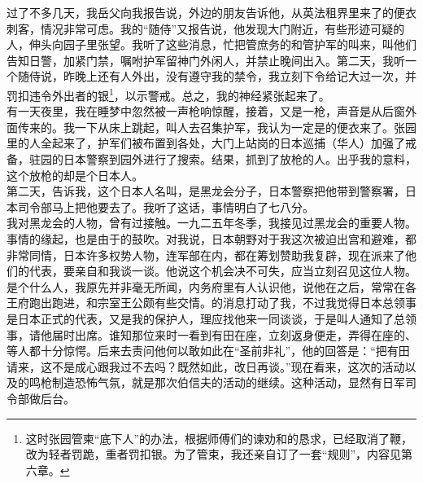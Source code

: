 过了不多几天，我岳父向我报告说，外边的朋友告诉他，从英法租界里来了的便衣刺客，情况非常可虑。我的“随侍”又报告说，他发现大门附近，有些形迹可疑的人，伸头向园子里张望。我听了这些消息，忙把管庶务的和管护军的叫来，叫他们告知日警，加紧门禁，嘱咐护军留神门外闲人，并禁止晚间出入。第二天，我听一个随侍说，昨晚上还有人外出，没有遵守我的禁令，我立刻下令给记大过一次，并罚扣违令外出者的银\footnote{这时张园管柬“底下人”的办法，根据师傅们的谏劝和的恳求，已经取消了鞭，改为轻者罚跪，重者罚扣银。为了管束，我还亲自订了一套“规则”，内容见第六章。}，以示警戒。总之，我的神经紧张起来了。\\

有一天夜里，我在睡梦中忽然被一声枪响惊醒，接着，又是一枪，声音是从后窗外面传来的。我一下从床上跳起，叫人去召集护军，我认为一定是的便衣来了。张园里的人全起来了，护军们被布置到各处，大门上站岗的日本巡捕（华人）加强了戒备，驻园的日本警察到园外进行了搜索。结果，抓到了放枪的人。出乎我的意料，这个放枪的却是个日本人。\\

第二天，告诉我，这个日本人名叫，是黑龙会分子，日本警察把他带到警察署，日本司令部马上把他要去了。我听了这话，事情明白了七八分。\\

我对黑龙会的人物，曾有过接触。一九二五年冬季，我接见过黑龙会的重要人物。事情的缘起，也是由于的鼓吹。对我说，日本朝野对于我这次被迫出宫和避难，都非常同情，日本许多权势人物，连军部在内，都在筹划赞助我复辟，现在派来了他们的代表，要亲自和我谈一谈。他说这个机会决不可失，应当立刻召见这位人物。是个什么人，我原先并非毫无所闻，内务府里有人认识他，说他在之后，常常在各王府跑出跑进，和宗室王公颇有些交情。的消息打动了我，不过我觉得日本总领事是日本正式的代表，又是我的保护人，理应找他来一同谈谈，于是叫人通知了总领事，请他届时出席。谁知那位来时一看到有田在座，立刻返身便走，弄得在座的、等人都十分惊愕。后来去责问他何以敢如此在“圣前非礼”，他的回答是：“把有田请来，这不是成心跟我过不去吗？既然如此，改日再谈。”现在看来，这次的活动以及的鸣枪制造恐怖气氛，就是那次伯信夫的活动的继续。这种活动，显然有日军司令部做后台。\\


